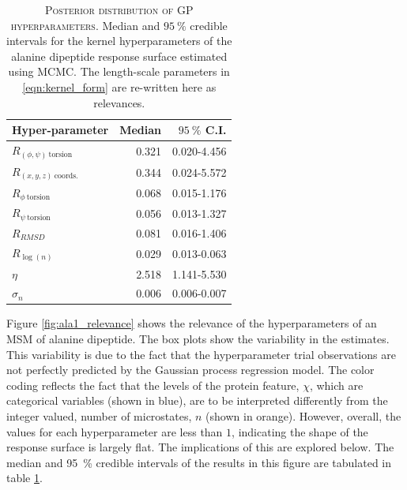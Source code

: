 \begin{table}
    \centering
    \begin{tabular}{lrr}
    \toprule
                          Hyper-parameter &    Median & $\SI{95}{\percent}$ C.I. \\
    \midrule
     $R_{(\phi, \psi)\ \mathrm{torsion}}$ &  0.321 & 0.020-4.456 \\
        $R_{(x, y, z)\ \mathrm{coords.}}$ &  0.344 & 0.024-5.572 \\
             $R_{\phi\ \mathrm{torsion}}$ &  0.068 & 0.015-1.176 \\
             $R_{\psi\ \mathrm{torsion}}$ &  0.056 & 0.013-1.327 \\
                               $R_{RMSD}$ &  0.081 & 0.016-1.406 \\
                          $R_{\log{(n)}}$ &  0.029 & 0.013-0.063 \\
                                   $\eta$ &  2.518 & 1.141-5.530 \\
                               $\sigma_n$ &  0.006 & 0.006-0.007 \\
    \bottomrule
    \end{tabular}
    \caption[Posterior distribution of GP hyperparameters]{\textsc{Posterior distribution of GP hyperparameters}. Median and $\SI{95}{\percent}$ credible intervals for the kernel hyperparameters of the alanine dipeptide response surface estimated using MCMC. The length-scale parameters in \ref{eqn:kernel_form} are re-written here as relevances.}
    \label{tab:ala1_rel_post}
\end{table}

% 
Figure \ref{fig:ala1_relevance} shows the relevance of the hyperparameters of an MSM of alanine dipeptide.  The box plots show the variability in the estimates.  This variability is due to the fact that the hyperparameter trial observations are not perfectly predicted by the Gaussian process regression model. The color coding reflects the fact that the levels of the protein feature, $\chi$, which are categorical variables (shown in blue), are to be interpreted differently from the integer valued, number of microstates, $n$ (shown in orange).  However, overall, the values for each hyperparameter are less than $1$, indicating the shape of the response surface is largely flat. The implications of this are explored below. The median and \SI{95}{\percent} credible intervals of the results in this figure are tabulated in table \ref{tab:ala1_rel_post}. 



